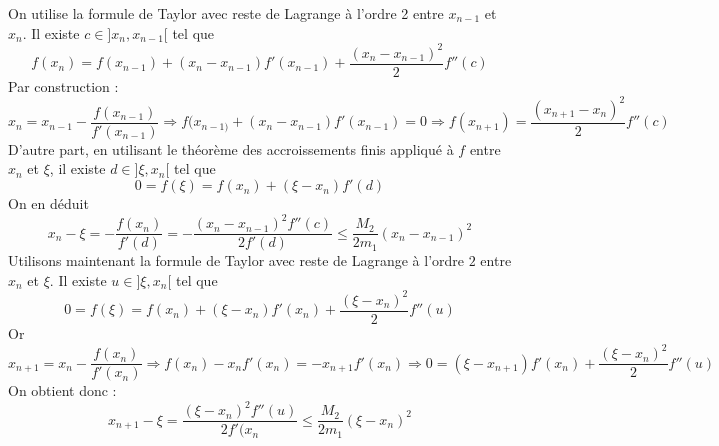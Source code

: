 \begin{demo}
 On utilise la formule de Taylor avec reste de Lagrange à l'ordre 2 entre $x_{n-1}$ et $x_{n}$. Il existe $c\in]x_n,x_{n-1}[$ tel que 
\begin{displaymath}
  f(x_{n})=f(x_{n-1})+(x_{n} -x_{n-1})f'(x_{n-1})+\frac{(x_{n}-x_{n-1})^2}{2}f''(c)
\end{displaymath}
Par construction :
\begin{displaymath}
 x_{n}=x_{n-1}-\frac{f(x_{n-1})}{f'(x_{n-1})}\Rightarrow f(x_{n-1)}+ (x_{n} -x_{n-1})f'(x_{n-1})=0
\Rightarrow f(x_{n+1})=\frac{(x_{n+1}-x_{n})^2}{2}f''(c)
\end{displaymath}
D'autre part, en utilisant le théorème des accroissements finis appliqué à $f$ entre $x_{n}$ et $\xi$, il existe $d\in ]\xi,x_{n}[$ tel que 
\begin{displaymath}
 0=f(\xi)=f(x_{n}) + (\xi-x_n)f'(d)
\end{displaymath}
On en déduit
\begin{displaymath}
 x_n -\xi = -\frac{f(x_n)}{f'(d)}= - \frac{(x_{n}-x_{n-1})^2f''(c)}{2f'(d)}\leq \frac{M_2}{2m_1}(x_{n}-x_{n-1})^2
\end{displaymath}
Utilisons maintenant la formule de Taylor avec reste de Lagrange à l'ordre $2$ entre $x_n$ et $\xi$. Il existe $u\in ]\xi,x_n[$ tel que 
\begin{displaymath}
  0=f(\xi)=f(x_{n})+(\xi -x_{n})f'(x_{n})+\frac{(\xi-x_{n})^2}{2}f''(u)
\end{displaymath}
Or
\begin{displaymath}
 x_{n+1} = x_n - \frac{f(x_n)}{f'(x_n)}\Rightarrow f(x_n)-x_nf'(x_n)=-x_{n+1}f'(x_n)
\Rightarrow 0= (\xi -x_{n+1})f'(x_{n})+\frac{(\xi-x_{n})^2}{2}f''(u)
\end{displaymath}
On obtient donc :
\begin{displaymath}
 x_{n+1}-\xi = \frac{(\xi-x_{n})^2f''(u)}{2f'(x_n}\leq \frac{M_2}{2m_1}(\xi-x_{n})^2
\end{displaymath}

\end{demo}

